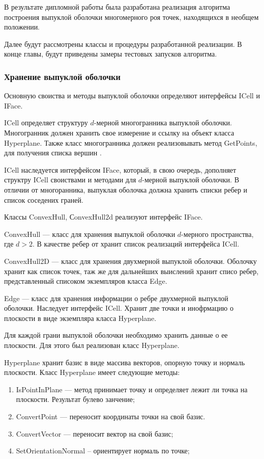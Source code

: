 \documentclass[14pt]{extarticle}
\begin{document}
В результате дипломной работы была разработана реализация алгоритма построения выпуклой оболочки многомерного роя точек, находящихся в необщем положении.

Далее будут рассмотрены классы и процедуры разработанной реализации.
В конце главы, будут приведены замеры тестовых запусков алгоритма.
\subsubsection{Хранение выпуклой оболочки}

Основную своиства и методы выпуклой оболочки определяют интерфейсы ICell и IFace.

ICell определяет структуру $d$-мерной многогранника выпуклой оболочки. Многогранник должен хранить свое измерение и ссылку на объект класса Hyper\-plane. Также класс многогранника должен реализовывать метод GetPoints, для получения списка вершин .

ICell наследуется интерфейсом IFace, который, в свою очередь, дополняет структру ICell своиствами и методами для $d$-мерной выпуклой оболочки.
В отличии от многоранника, выпуклая оболочка должна хранить списки ребер и список соседених граней.

Классы ConvexHull, СonvexHull2d реализуют интерфейс IFace.

ConvexHull --- класс для хранения выпуклой оболочки $d$-мерного пространства, где $d>2$. В качестве ребер от хранит список реализаций интерфейса ICell.

ConvexHull2D --- класс для хранения двухмерной выпуклой оболочки. Оболочку хранит как список точек, таж же для дальнейших выислений хранит списо ребер, представленный списоком экземпляров класса Edge.

Edge --- класс для хранения информации о ребре двухмерной выпуклой оболочки. Наследует интерфейс ICell. Хранит две точки и инофрмацию о плоскости в виде экземпляра класса Hyperplane.

Для каждой грани выпуклой оболочки необходимо хранить данные о ее плоскости. Для этого был реализован класс Hyperplane.

Hyperplane хранит базис в виде массива векторов, опорную точку и нормаль плоскости. Класс Hyperplane имеет следующие методы:
\begin{enumerate}[topsep=-0.5\parsep,itemsep=-0.5\parsep]
  \item IsPointInPlane --- метод принимает точку и определяет лежит ли точка на плоскости. Результат булево занчение;
  \item ConvertPoint --- переносит координаты точки на свой базис.
  \item ConvertVector --- переносит вектор на свой базис;
  \item SetOrientationNormal -- ориентирует нормаль по точке;
\end{enumerate}
\medskip
\end{document}
